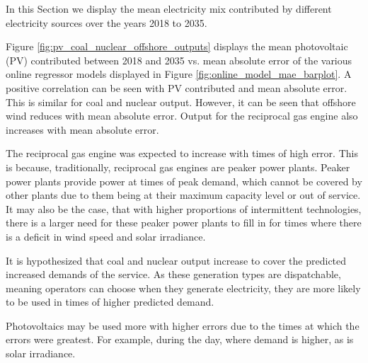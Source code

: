 \documentclass[final,3p,times,twocolumn,numbers]{elsarticle}
\begin{document}
In this Section we display the mean electricity mix contributed by different electricity sources over the years 2018 to 2035. 

Figure \ref{fig:pv_coal_nuclear_offshore_outputs} displays the mean photovoltaic (PV) contributed between 2018 and 2035 vs. mean absolute error of the various online regressor models displayed in Figure \ref{fig:online_model_mae_barplot}. A positive correlation can be seen with PV contributed and mean absolute error. This is similar for coal and nuclear output. However, it can be seen that offshore wind reduces with mean absolute error. Output for the reciprocal gas engine also increases with mean absolute error.

The reciprocal gas engine was expected to increase with times of high error. This is because, traditionally, reciprocal gas engines are peaker power plants. Peaker power plants provide power at times of peak demand, which cannot be covered by other plants due to them being at their maximum capacity level or out of service. It may also be the case, that with higher proportions of intermittent technologies, there is a larger need for these peaker power plants to fill in for times where there is a deficit in wind speed and solar irradiance.

It is hypothesized that coal and nuclear output increase to cover the predicted increased demands of the service. As these generation types are dispatchable, meaning operators can choose when they generate electricity, they are more likely to be used in times of higher predicted demand.

Photovoltaics may be used more with higher errors due to the times at which the errors were greatest. For example, during the day, where demand is higher, as is solar irradiance.


    
    

    
\end{document}
